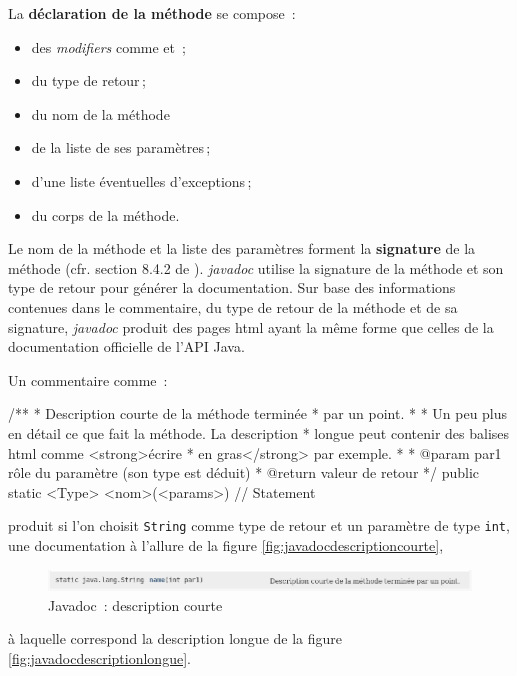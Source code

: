 La \textbf{déclaration de la méthode} se compose~:

\begin{itemize}
	\item des \textit{modifiers} comme  et \,;
	\item du type de retour\,;
	\item du nom de la méthode\,
	\item de la liste de ses paramètres\,;
	\item d'une liste éventuelles d'exceptions\,;
	\item du corps de la méthode.
\end{itemize}

Le nom de la méthode et la liste des paramètres forment la \textbf{signature}
de la méthode (cfr. section 8.4.2 de \cite{jls9}). \textit{javadoc} utilise la
signature de la méthode et son type de retour pour générer la documentation.
Sur base des informations contenues dans le commentaire, du type de retour de
la méthode et de sa signature, \textit{javadoc} produit des pages html ayant la
même forme que celles de la documentation officielle de l'API Java.  

\pagebreak
Un commentaire comme~:

\begin{java}
/**
* Description courte de la méthode terminée 
* par un point.
* 
* Un peu plus en détail ce que fait la méthode. La description 
* longue peut contenir des balises html comme <strong>écrire 
* en gras</strong> par exemple. 
* 
* @param par1 rôle du paramètre (son type est déduit)
* @return valeur de retour
*/
public static <Type> <nom>(<params>){
	// Statement
}
\end{java}

produit si l'on choisit \texttt{String} comme type de retour et un paramètre de
type \texttt{int}, une documentation à l'allure de la figure
\vref{fig:javadocdescriptioncourte},

\begin{figure}[h]
	\centering
	\includegraphics[width=.9\linewidth]{images/javadoc-descriptioncourte.png}
	\caption{Javadoc~: description courte}
	\label{fig:javadocdescriptioncourte}
\end{figure}

à laquelle correspond la description longue de la figure
\vref{fig:javadocdescriptionlongue}.

